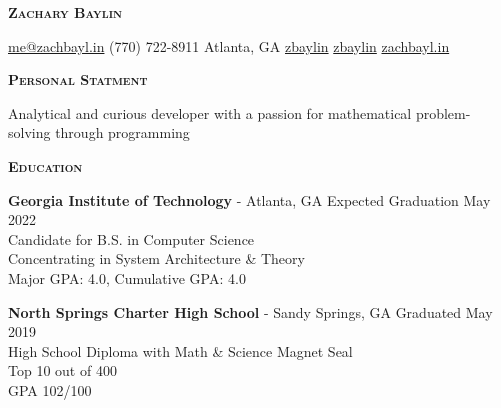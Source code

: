\documentclass{article}
\newcommand{\sectionHeader}[1]{{\large \textbf{\textsc{#1}}}\hspace{5pt}\xrfill[.5ex]{.4pt}}
\begin{document}
  \begin{center}
    {\Large \textbf{\textsc{Zachary Baylin}}}

    \vspace{3pt}

    \href{mailto:me@zachbayl.in}{\faEnvelope \hspace{1pt} me@zachbayl.in} \hspace{3pt} \faPhone \hspace{1pt} (770) 722-8911 \hspace{3pt}  Atlanta, GA \hspace{3pt} \href{https://linkedin.com/in/zbaylin}{\faLinkedin \hspace{1pt} zbaylin} \hspace{3pt} \href{https://github.com/zbaylin}{\faGithub \hspace{1pt} zbaylin} \hspace{3pt} \href{http://zachbayl.in}{\faGlobeAmericas \hspace{1pt} zachbayl.in}\\
  \end{center}

  \sectionHeader{Personal Statment}

  \vspace{3pt}

  Analytical and curious developer with a passion for mathematical problem-solving through programming

  \vspace{8pt}

  \sectionHeader{Education}

  \vspace{3pt}

  \textbf{Georgia Institute of Technology} - Atlanta, GA \hspace*{\fill}Expected Graduation May 2022\\
  Candidate for B.S. in Computer Science\\
  Concentrating in System Architecture \& Theory\\
  Major GPA: 4.0, Cumulative GPA: 4.0

  \vspace{5pt}

  \textbf{North Springs Charter High School} - Sandy Springs, GA \hspace*{\fill}Graduated May 2019\\
  High School Diploma with Math \& Science Magnet Seal\\
  Top 10 out of 400\\
  GPA 102/100
\end{document}
